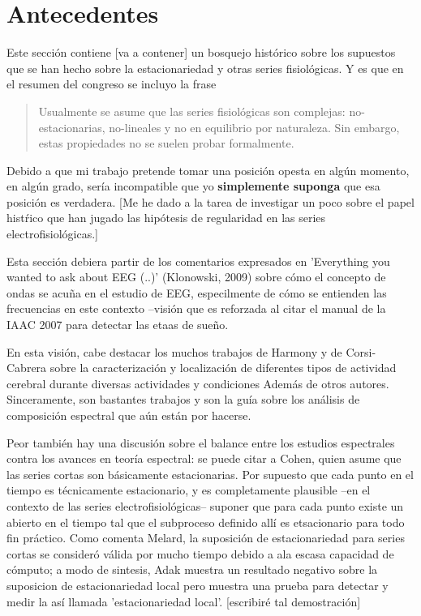 \chapter{Antecedentes}

Este secci\'on contiene [va a contener] un bosquejo hist\'orico sobre los supuestos que se
han hecho sobre la estacionariedad y otras series fisiol\'ogicas. Y es que en el resumen del
congreso se incluyo la frase 

\begin{quotation}
Usualmente se asume que las series fisiol\'ogicas son complejas:
no-estacionarias, no-lineales y no en equilibrio por naturaleza. Sin embargo, estas propiedades
no se suelen probar formalmente.
\end{quotation}

Debido a que mi trabajo pretende tomar una posici\'on opesta en alg\'un momento, en alg\'un grado,
ser\'ia incompatible que yo \textbf{simplemente suponga} que esa posici\'on es verdadera.
[Me he dado a la tarea de investigar un poco sobre el papel hist\'rico que han jugado las
hip\'otesis de regularidad en las series electrofisiol\'ogicas.]

Esta secci\'on debiera partir de los comentarios expresados 
en 'Everything you wanted to ask about EEG (..)'
(Klonowski, 2009) sobre c\'omo el concepto de ondas se acu\~na en el estudio de EEG, especilmente
de c\'omo se entienden las frecuencias en este contexto --visi\'on que es reforzada al citar
el manual de la IAAC 2007 para detectar las etaas de sue\~no.

En esta visi\'on, cabe destacar los muchos trabajos de Harmony y de Corsi-Cabrera
sobre la caracterizaci\'on y localizaci\'on de diferentes tipos de actividad cerebral 
durante diversas actividades y condiciones Adem\'as de otros autores. 
Sinceramente, son bastantes trabajos y
son la gu\'ia sobre los an\'alisis de composici\'on espectral que a\'un est\'an por hacerse.

Peor tambi\'en hay una discusi\'on sobre el balance entre los estudios espectrales contra
los avances en teor\'ia espectral: se puede citar a Cohen, quien asume que las series
cortas son b\'asicamente estacionarias. Por supuesto que cada punto en el tiempo es
t\'ecnicamente estacionario, y es completamente plausible --en el contexto de las series
electrofisiol\'ogicas-- suponer que para cada punto existe un abierto
en el tiempo tal que el subproceso definido all\'i es etsacionario para todo fin pr\'actico.
Como comenta Melard, la suposici\'on de estacionariedad para series cortas se 
consider\'o v\'alida por mucho tiempo debido a ala escasa capacidad de c\'omputo; a
modo de sintesis, Adak muestra un resultado negativo sobre la suposicion de estacionariedad
local pero muestra una prueba para detectar y medir la as\'i llamada 'estacionariedad local'.
[escribir\'e tal demostraci\'on]

